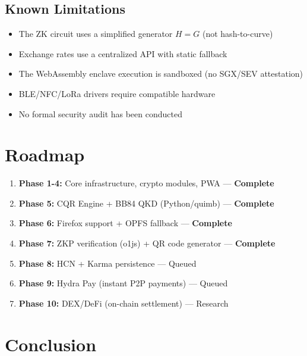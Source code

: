 \documentclass[11pt,a4paper]{article}
\begin{document}
\subsection{Known Limitations}
\begin{itemize}[nosep]
  \item The ZK circuit uses a simplified generator $H = G$ (not hash-to-curve)
  \item Exchange rates use a centralized API with static fallback
  \item The WebAssembly enclave execution is sandboxed (no SGX/SEV attestation)
  \item BLE/NFC/LoRa drivers require compatible hardware
  \item No formal security audit has been conducted
\end{itemize}

\section{Roadmap}

\begin{enumerate}[nosep]
  \item \textbf{Phase 1-4:} Core infrastructure, crypto modules, PWA --- \textcolor{voidgreen}{\textbf{Complete}}
  \item \textbf{Phase 5:} CQR Engine + BB84 QKD (Python/quimb) --- \textcolor{voidgreen}{\textbf{Complete}}
  \item \textbf{Phase 6:} Firefox support + OPFS fallback --- \textcolor{voidgreen}{\textbf{Complete}}
  \item \textbf{Phase 7:} ZKP verification (o1js) + QR code generator --- \textcolor{voidgreen}{\textbf{Complete}}
  \item \textbf{Phase 8:} HCN + Karma persistence --- Queued
  \item \textbf{Phase 9:} Hydra Pay (instant P2P payments) --- Queued
  \item \textbf{Phase 10:} DEX/DeFi (on-chain settlement) --- Research
\end{enumerate}

\section{Conclusion}
\end{document}
